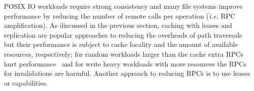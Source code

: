 %
%


POSIX IO workloads require strong consistency and many file systems improve
performance by reducing the number of remote calls per operation ({\it i.e.}
RPC amplification). As discussed in the previous section, caching with leases and
replication are popular approaches to reducing the overheads of path traversals
but their performance is subject to cache locality and the amount of available
resources, respectively; for random workloads larger than the cache extra RPCs
hurt performance~\cite{ren:sc2014-indexfs, weil:sc2004-dyn-metadata} and for write heavy workloads with more
resources the RPCs for invalidations are harmful. Another approach to reducing
RPCs is to use leases or capabilities.  


